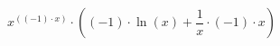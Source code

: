 \documentclass[a4paper,12pt]{article}
\begin{document}
$$x ^{((-1) \cdot x)}  \cdot ((-1) \cdot  \ln (x)  +  \frac{1}{x}  \cdot (-1) \cdot x)$$
\end{document}
